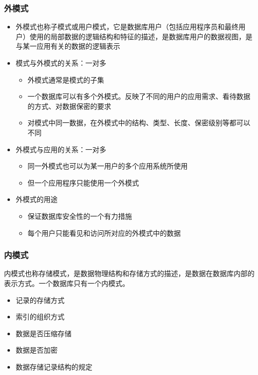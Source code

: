 \subsubsection{外模式}
\begin{itemize}
    \item 外模式也称子模式或用户模式，它是数据库用户（包括应用程序员和最终用户）使用的局部数据的逻辑结构和特征的描述，是数据库用户的数据视图，是与某一应用有关的数据的逻辑表示
    \item 模式与外模式的关系：一对多
    \begin{itemize}
        \item 外模式通常是模式的子集
        \item 一个数据库可以有多个外模式。反映了不同的用户的应用需求、看待数据的方式、对数据保密的要求
        \item 对模式中同一数据，在外模式中的结构、类型、长度、保密级别等都可以不同
    \end{itemize}
    \item 外模式与应用的关系：一对多
    \begin{itemize}
        \item 同一外模式也可以为某一用户的多个应用系统所使用
        \item 但一个应用程序只能使用一个外模式
    \end{itemize}
    \item 外模式的用途
    \begin{itemize}
        \item 保证数据库安全性的一个有力措施
        \item 每个用户只能看见和访问所对应的外模式中的数据
    \end{itemize}
\end{itemize}

\subsubsection{内模式}
内模式也称存储模式，是数据物理结构和存储方式的描述，是数据在数据库内部的表示方式。一个数据库只有一个内模式。
\vspace{-0.8em}
\begin{multicols}{2}
    \begin{itemize}
        \item 记录的存储方式
        \item 索引的组织方式
        \item 数据是否压缩存储
        \item 数据是否加密
        \item 数据存储记录结构的规定
    \end{itemize}
\end{multicols}
\vspace{-1em}

